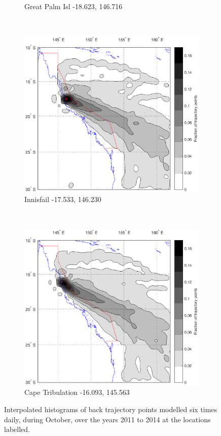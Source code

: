 \begin{figure}[!hbt]
\begin{subfigure}[b]{0.45\textwidth}
		\caption{Great Palm Isl -18.623, 146.716}
		\label{subfig:luci}
	\end{subfigure}
	\\
    \begin{subfigure}[b]{0.45\textwidth}
	    \includegraphics[width=\textwidth]{Fig/Research/BT_Ship/Map_105.eps}
	    \caption{Innisfail -17.533, 146.230}
	    \label{subfig:cair}
    \end{subfigure}
    ~
    \begin{subfigure}[b]{0.45\textwidth}
	    \includegraphics[width=\textwidth]{Fig/Research/BT_Ship/Map_106.eps}
	    \caption{Cape Tribulation -16.093, 145.563}
	    \label{subfig:cair}
    \end{subfigure}
    \caption{Interpolated histograms of back trajectory points modelled six times daily, during October, over the years 2011 to 2014 at the locations labelled.}
    \label{fig:btshipoct}
\end{figure}	

